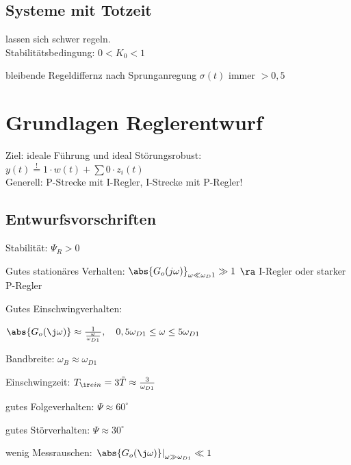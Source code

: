 \documentclass[german]{latex4ei/latex4ei_sheet}
\begin{document}
\begin{sectionbox}
	\subsection{Systeme mit Totzeit}
	lassen sich schwer regeln.\\

	Stabilitätsbedingung: $0 < K_0 < 1$

	bleibende Regeldiffernz nach Sprunganregung $\sigma (t)$ immer $ > 0,5$
\end{sectionbox}




\section{Grundlagen Reglerentwurf}
Ziel: ideale Führung und ideal Störungsrobust:\\
$y(t) \stackrel{!}{=} 1 \cdot w(t) + \sum 0 \cdot z_i(t)$\\
Generell: P-Strecke mit I-Regler, I-Strecke mit P-Regler!

\begin{sectionbox}
	\subsection{Entwurfsvorschriften}
	Stabilität: $\Psi_R > 0$

	Gutes stationäres Verhalten: $\abs{G_o (j \omega)}_{\omega \ll \omega_D1} \gg 1$
	$\ra$ I-Regler oder starker P-Regler

	Gutes Einschwingverhalten:

	$\abs{G_o (\j \omega)} \approx \frac{1}{\frac{\omega}{\omega_{D1}}}, \quad 0,5 \omega_{D1} \le \omega \le 5 \omega_{D1}$

	Bandbreite: $\omega_B \approx \omega_{D1}$

	Einschwingzeit: $T_{\ir ein} = 3 \tilde{T} \approx \frac{3}{\omega_{D1} }$

	gutes Folgeverhalten: $\Psi \approx 60^\circ$

	gutes Störverhalten: $\Psi \approx 30^\circ$

	wenig Messrauschen: $\left. \abs{G_o (\j \omega)}\right|_{\omega \gg \omega_{D1}} \ll 1$
\end{sectionbox}
\end{document}
